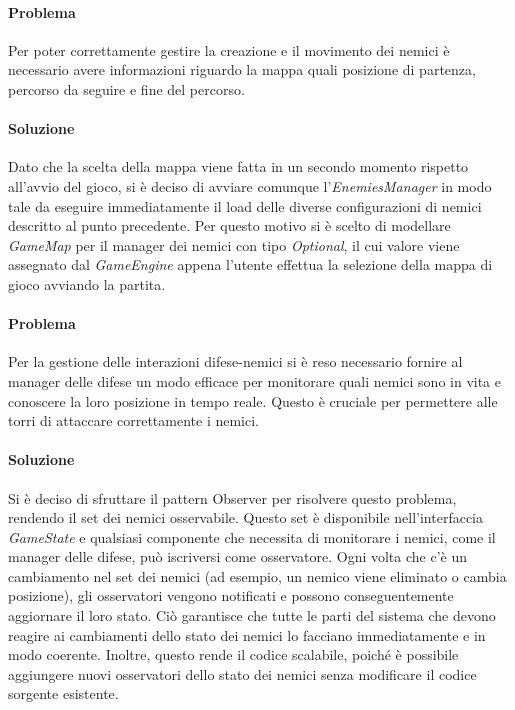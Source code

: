 \documentclass[a4paper,12pt]{report}
\begin{document}
\paragraph{Problema} Per poter correttamente gestire la creazione e il movimento dei nemici è necessario avere informazioni riguardo la mappa quali posizione di partenza, percorso da seguire e fine del percorso.

\paragraph{Soluzione} Dato che la scelta della mappa viene fatta in un secondo momento rispetto all'avvio del gioco, si è deciso di avviare comunque l'\textit{EnemiesManager} in modo tale da eseguire immediatamente il load delle diverse configurazioni di nemici descritto al punto precedente. Per questo motivo si è scelto di modellare \textit{GameMap} per il manager dei nemici con tipo \textit{Optional}, il cui valore viene assegnato dal \textit{GameEngine} appena l'utente effettua la selezione della mappa di gioco avviando la partita.

\paragraph{Problema} Per la gestione delle interazioni difese-nemici si è reso necessario fornire al manager delle difese un modo efficace per monitorare quali nemici sono in vita e conoscere la loro posizione in tempo reale. Questo è cruciale per permettere alle torri di attaccare correttamente i nemici.

\paragraph{Soluzione} Si è deciso di sfruttare il pattern Observer per risolvere questo problema, rendendo il set dei nemici osservabile. Questo set è disponibile nell'interfaccia \textit{GameState} e qualsiasi componente che necessita di monitorare i nemici, come il manager delle difese, può iscriversi come osservatore. Ogni volta che c'è un cambiamento nel set dei nemici (ad esempio, un nemico viene eliminato o cambia posizione), gli osservatori vengono notificati e possono conseguentemente aggiornare il loro stato. Ciò garantisce che tutte le parti del sistema che devono reagire ai cambiamenti dello stato dei nemici lo facciano immediatamente e in modo coerente. Inoltre, questo rende il codice scalabile, poiché è possibile aggiungere nuovi osservatori dello stato dei nemici senza modificare il codice sorgente esistente.
\end{document}

